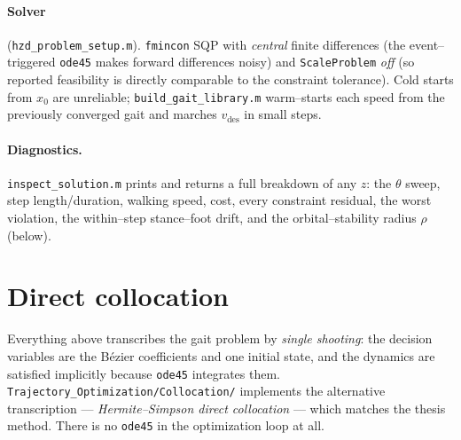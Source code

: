 \documentclass[11pt,a4paper]{article}
\newcommand{\code}[1]{\texttt{#1}}          %
\newcommand{\fname}[1]{\texttt{#1}}          %
\begin{document}
\paragraph{Solver} (\fname{hzd\_problem\_setup.m}). \code{fmincon} SQP with
\emph{central} finite differences (the event--triggered \code{ode45} makes
forward differences noisy) and \code{ScaleProblem} \emph{off} (so reported
feasibility is directly comparable to the constraint tolerance). Cold starts
from $x_0$ are unreliable; \fname{build\_gait\_library.m} warm--starts each
speed from the previously converged gait and marches $v_{\text{des}}$ in small
steps.

\paragraph{Diagnostics.} \fname{inspect\_solution.m} prints and returns a full
breakdown of any $z$: the $\theta$ sweep, step length/duration, walking speed,
cost, every constraint residual, the worst violation, the within--step
stance--foot drift, and the orbital--stability radius $\rho$ (below).

\section{Direct collocation}
\label{sec:collocation}
Everything above transcribes the gait problem by \emph{single shooting}: the
decision variables are the B\'ezier coefficients and one initial state, and the
dynamics are satisfied implicitly because \code{ode45} integrates them.
\fname{Trajectory\_Optimization/Collocation/} implements the alternative
transcription --- \emph{Hermite--Simpson direct collocation} --- which matches
the thesis method. There is no \code{ode45} in the optimization loop at all.
\end{document}
